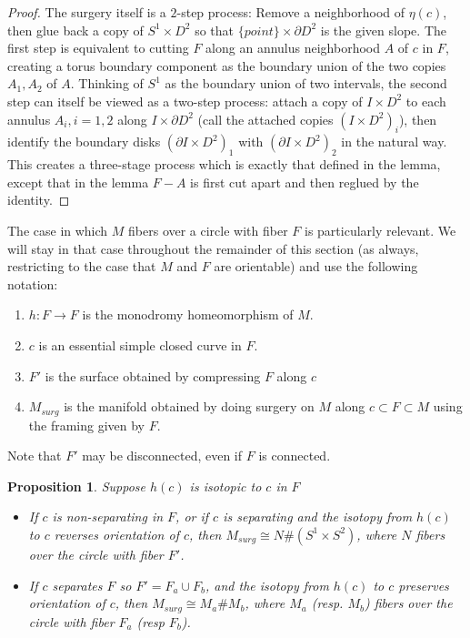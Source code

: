 \documentclass{amsart}
\newtheorem{prop}[thm]{Proposition}
\newcommand{\bdd}{\mbox{$\partial$}}
\begin{document}
\begin{proof}  The surgery itself is a $2$-step process: Remove a neighborhood of $\eta(c)$, then glue back a copy of $S^1 \times D^2$ so that $\{point \} \times \bdd D^2$ is the given slope.  The first step is equivalent to cutting $F$ along an annulus neighborhood $A$ of $c$ in $F$, creating a torus boundary component as the boundary union of the two copies $A_1, A_2$ of $A$.  Thinking of $S^1$ as the boundary union of two intervals, the second step can itself be viewed as a two-step process:  attach a copy of $I \times D^2$ to each annulus $A_i, i = 1, 2$ along $I \times \bdd D^2$ (call the attached copies $(I \times D^2)_i$), then identify the boundary disks $(\bdd I \times D^2)_1$ with $(\bdd I \times D^2)_2$ in the natural way.  This creates a three-stage process which is exactly that defined in the lemma, except that in the lemma $F-A$ is first cut apart and then reglued by the identity. \end{proof}

The case in which $M$ fibers over a circle with fiber $F$ is particularly relevant.  We will stay in that case throughout the remainder of this section (as always, restricting to the case that $M$ and $F$ are orientable) and use the following notation:
\begin{enumerate}
\item $h: F \to F$ is the monodromy homeomorphism of $M$.
\item $c$ is an essential simple closed curve in $F$.
\item $F'$ is the surface obtained by compressing $F$ along $c$
\item $M_{surg}$ is the manifold obtained by doing surgery on $M$ along $c \subset F \subset M$ using the framing given by $F$.
\end{enumerate}
Note that $F'$ may be disconnected, even if $F$ is connected.

\begin{prop}  \label{prop:isotopic1}  Suppose $h(c)$ is isotopic to $c$ in $F$
\begin{itemize}
\item If $c$ is non-separating in $F$, or if $c$ is separating and the isotopy from $h(c)$ to $c$ reverses orientation of $c$, then $M_{surg} \cong N \# (S^1 \times S^2)$, where $N$ fibers over the circle with fiber $F'$.
\item If $c$ separates $F$ so $F' = F_a \cup F_b$, and the isotopy from $h(c)$ to $c$ preserves orientation of $c$, then $M_{surg} \cong M_a \# M_b$, where $M_a$ (resp. $M_b$) fibers over the circle with fiber $F_a$ (resp $F_b$).
\end{itemize}
\end{prop}
\end{document}
